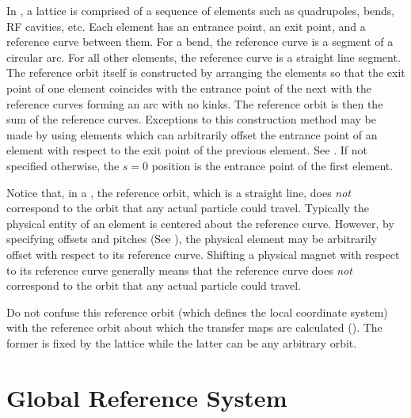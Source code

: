 In \bmad, a lattice is comprised of a sequence of elements such as
quadrupoles, bends, RF cavities, etc. Each element has an entrance
point, an exit point, and a reference curve between them. For a bend,
the reference curve is a segment of a circular arc. For all other
elements, the reference curve is a straight line segment. The
reference orbit itself is constructed by arranging the elements so
that the exit point of one element coincides with the entrance point
of the next with the reference curves forming an arc with no kinks.
The reference orbit is then the sum of the reference
curves. Exceptions to this construction method may be made by using
 elements which can arbitrarily offset the entrance point
of an element with respect to the exit point of the previous element.
See .  If not specified otherwise, the $s = 0$
position is the entrance point of the first element.

Notice that, in a , the reference orbit, which is a
straight line, does {\em not} correspond to the orbit that any actual
particle could travel. Typically the physical entity of an element is
centered about the reference curve. However, by specifying offsets and
pitches (See ), the physical element may be
arbitrarily offset with respect to its reference curve.  Shifting a
physical magnet with respect to its reference curve generally means
that the reference curve does {\em not} correspond to the orbit that
any actual particle could travel.

Do not confuse this reference orbit (which defines the local
coordinate system) with the reference orbit about which the transfer
maps are calculated (). The former is fixed by the
lattice while the latter can be any arbitrary orbit.

\section{Global Reference System}
\label{s:global}

